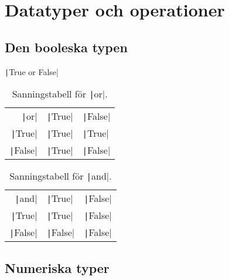 \section{Datatyper och operationer}

\subsection{Den booleska typen}

\begin{frame}
  \begin{center}
    \texttt|True or False|
  \end{center}
\end{frame}

\begin{frame}
  \begin{table}
    \begin{tabular}{rll}
      \texttt|or| & \texttt|True| & \texttt|False| \\
      \texttt|True| & \texttt|True| & \texttt|True| \\
      \texttt|False| & \texttt|True| & \texttt|False|
    \end{tabular}
    \caption{Sanningstabell för \texttt|or|.}
  \end{table}

  \pause

  \begin{table}
    \begin{tabular}{rll}
      \texttt|and| & \texttt|True| & \texttt|False| \\
      \texttt|True| & \texttt|True| & \texttt|False| \\
      \texttt|False| & \texttt|False| & \texttt|False|
    \end{tabular}
    \caption{Sanningstabell för \texttt|and|.}
  \end{table}
\end{frame}


\subsection{Numeriska typer}

